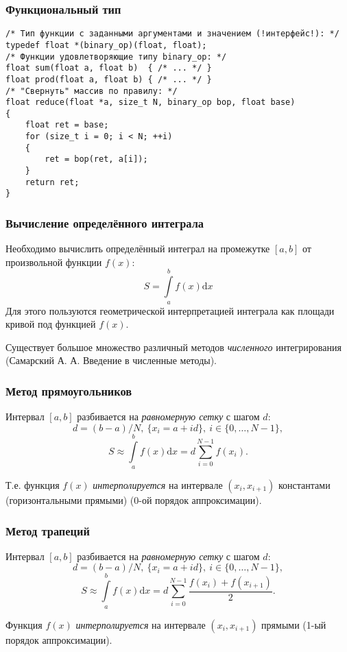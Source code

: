 \documentclass{beamer}
\begin{document}
    \begin{frame}[fragile]
        \frametitle{Функциональный тип}
        \begin{verbatim}
/* Тип функции с заданными аргументами и значением (!интерфейс!): */
typedef float *(binary_op)(float, float);
/* Функции удовлетворяющие типу binary_op: */
float sum(float a, float b)  { /* ... */ }
float prod(float a, float b) { /* ... */ }
/* "Свернуть" массив по правилу: */
float reduce(float *a, size_t N, binary_op bop, float base)
{
    float ret = base;
    for (size_t i = 0; i < N; ++i)
    {
        ret = bop(ret, a[i]);
    }
    return ret;
}
        \end{verbatim}
    \end{frame}
    \begin{frame}[fragile]
        \frametitle{Вычисление определённого интеграла}
        \justifying
        Необходимо вычислить определённый интеграл на промежутке $[a, b]$ от произвольной функции $f(x)$:
        \begin{equation}
            S = \int\limits_{a}^{b} f(x) \textrm{d}x
        \end{equation}
        \justifying
        Для этого пользуются геометрической интерпретацией интеграла как площади кривой под функцией $f(x)$. 
        \par
        \vspace{0.2cm}
        \justifying
        Существует большое множество различный методов {\it численного} интегрирования (Самарский А. А. Введение в численные методы). 
    \end{frame}
    \begin{frame}[fragile]
        \frametitle{Метод прямоугольников}
        \justifying
        Интервал $[a, b]$ разбивается на {\it равномерную сетку} с шагом $d$: 
        $$d = (b - a) / N,\ \{x_{i} = a + id\},\ i \in \{0, \dotsc, N - 1\},$$
        $$S \approx \int\limits_{a}^{b} f(x) \textrm{d}x = d\sum_{i=0}^{N-1}f(x_{i}).$$
        \par
        \justifying
        Т.е. функция $f(x)$ {\it интерполируется} на интервале $(x_{i}, x_{i+1})$ константами (горизонтальными прямыми) (0-ой порядок аппроксимации).
    \end{frame}
    \begin{frame}[fragile]
        \frametitle{Метод трапеций}
        \justifying
        Интервал $[a, b]$ разбивается на {\it равномерную сетку} с шагом $d$: 
        $$d = (b - a) / N,\ \{x_{i} = a + id\},\ i \in \{0, \dotsc, N - 1\},$$
        $$S \approx \int\limits_{a}^{b} f(x) \textrm{d}x = d\sum_{i=0}^{N-1}\frac{f(x_{i}) + f(x_{i + 1})}{2}.$$
        \par
        \justifying
        Функция $f(x)$ {\it интерполируется} на интервале $(x_{i}, x_{i+1})$ прямыми (1-ый порядок аппроксимации).
    \end{frame}
\end{document}
